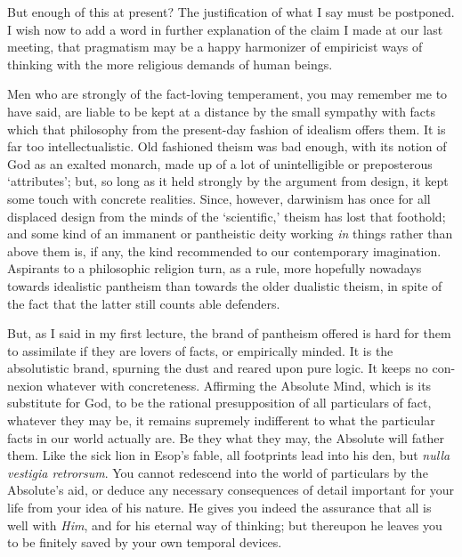 But enough of this at present? The justification of what I say must be
postponed. I wish now to add a word in further explanation of the
claim I made at our last meeting, that pragmatism may be a happy
harmonizer of empiricist ways of thinking with the more religious
demands of human beings.

\vspace{1\baselineskip}

Men who are strongly of the fact-loving temperament, you may remember
me to have said, are liable to be kept at a distance by the small
 sympathy with facts which that philosophy from the
present-day fashion of idealism offers them. It is far too
intellectualistic. Old fashioned theism was bad enough, with its
notion of God as an exalted monarch, made up of a lot of
unintelligible or preposterous `attributes'; but, so long as it held
strongly by the argument from design, it kept some touch with concrete
realities. Since, however, darwinism has once for all displaced design
from the minds of the `scientific,' theism has lost that foothold; and
some kind of an immanent or pantheistic deity working \textit{in}
things rather than above them is, if any, the kind recommended to our
contemporary imagination. Aspirants to a philosophic religion turn, as
a rule, more hopefully nowadays towards idealistic pantheism than
towards the older dualistic theism, in spite of the fact that the
latter still counts able defenders.

But, as I said in my first lecture, the brand of pantheism offered is
hard for them to assimilate if they are lovers of facts, or
empirically minded. It is the absolutistic brand, spurning the dust
and reared upon pure logic. It keeps no con-nexion whatever
with concreteness. Affirming the Absolute Mind, which is its
substitute for God, to be the rational presupposition of all
particulars of fact, whatever they may be, it remains supremely
indifferent to what the particular facts in our world actually are. Be
they what they may, the Absolute will father them. Like the sick lion
in Esop's fable, all footprints lead into his den, but \textit{nulla
vestigia retrorsum}. You cannot redescend into the world of
particulars by the Absolute's aid, or deduce any necessary
consequences of detail important for your life from your idea of his
nature. He gives you indeed the assurance that all is well with
\textit{Him}, and for his eternal way of thinking; but thereupon he
leaves you to be finitely saved by your own temporal devices.

